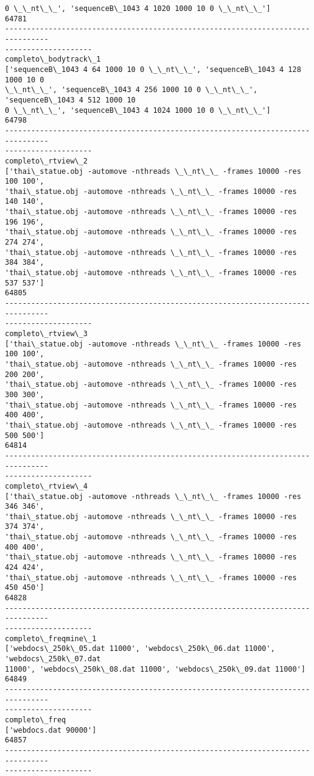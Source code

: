 \documentclass[11pt]{article}
\begin{document}
\begin{Verbatim}[commandchars=\\\{\}]
0 \_\_nt\_\_', 'sequenceB\_1043 4 1020 1000 10 0 \_\_nt\_\_']
64781
--------------------------------------------------------------------------------
--------------------
completo\_bodytrack\_1
['sequenceB\_1043 4 64 1000 10 0 \_\_nt\_\_', 'sequenceB\_1043 4 128 1000 10 0
\_\_nt\_\_', 'sequenceB\_1043 4 256 1000 10 0 \_\_nt\_\_', 'sequenceB\_1043 4 512 1000 10
0 \_\_nt\_\_', 'sequenceB\_1043 4 1024 1000 10 0 \_\_nt\_\_']
64798
--------------------------------------------------------------------------------
--------------------
completo\_rtview\_2
['thai\_statue.obj -automove -nthreads \_\_nt\_\_ -frames 10000 -res 100 100',
'thai\_statue.obj -automove -nthreads \_\_nt\_\_ -frames 10000 -res 140 140',
'thai\_statue.obj -automove -nthreads \_\_nt\_\_ -frames 10000 -res 196 196',
'thai\_statue.obj -automove -nthreads \_\_nt\_\_ -frames 10000 -res 274 274',
'thai\_statue.obj -automove -nthreads \_\_nt\_\_ -frames 10000 -res 384 384',
'thai\_statue.obj -automove -nthreads \_\_nt\_\_ -frames 10000 -res 537 537']
64805
--------------------------------------------------------------------------------
--------------------
completo\_rtview\_3
['thai\_statue.obj -automove -nthreads \_\_nt\_\_ -frames 10000 -res 100 100',
'thai\_statue.obj -automove -nthreads \_\_nt\_\_ -frames 10000 -res 200 200',
'thai\_statue.obj -automove -nthreads \_\_nt\_\_ -frames 10000 -res 300 300',
'thai\_statue.obj -automove -nthreads \_\_nt\_\_ -frames 10000 -res 400 400',
'thai\_statue.obj -automove -nthreads \_\_nt\_\_ -frames 10000 -res 500 500']
64814
--------------------------------------------------------------------------------
--------------------
completo\_rtview\_4
['thai\_statue.obj -automove -nthreads \_\_nt\_\_ -frames 10000 -res 346 346',
'thai\_statue.obj -automove -nthreads \_\_nt\_\_ -frames 10000 -res 374 374',
'thai\_statue.obj -automove -nthreads \_\_nt\_\_ -frames 10000 -res 400 400',
'thai\_statue.obj -automove -nthreads \_\_nt\_\_ -frames 10000 -res 424 424',
'thai\_statue.obj -automove -nthreads \_\_nt\_\_ -frames 10000 -res 450 450']
64828
--------------------------------------------------------------------------------
--------------------
completo\_freqmine\_1
['webdocs\_250k\_05.dat 11000', 'webdocs\_250k\_06.dat 11000', 'webdocs\_250k\_07.dat
11000', 'webdocs\_250k\_08.dat 11000', 'webdocs\_250k\_09.dat 11000']
64849
--------------------------------------------------------------------------------
--------------------
completo\_freq
['webdocs.dat 90000']
64857
--------------------------------------------------------------------------------
--------------------
    \end{Verbatim}
\end{document}

